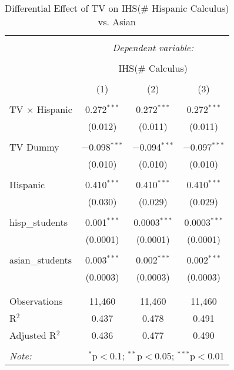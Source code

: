 
\begin{table}[!htbp] \centering 
  \caption{Differential Effect of TV on IHS(\# Hispanic Calculus) vs. Asian} 
  \label{} 
\begin{tabular}{@{\extracolsep{-2pt}}lccc} 
\\[-1.8ex]\hline 
\hline \\[-1.8ex] 
 & \multicolumn{3}{c}{\textit{Dependent variable:}} \\ 
\cline{2-4} 
\\[-1.8ex] & \multicolumn{3}{c}{IHS(\# Calculus)} \\ 
\\[-1.8ex] & (1) & (2) & (3)\\ 
\hline \\[-1.8ex] 
 TV $\times$ Hispanic & 0.272$^{***}$ & 0.272$^{***}$ & 0.272$^{***}$ \\ 
  & (0.012) & (0.011) & (0.011) \\ 
  & & & \\ 
 TV Dummy & $-$0.098$^{***}$ & $-$0.094$^{***}$ & $-$0.097$^{***}$ \\ 
  & (0.010) & (0.010) & (0.010) \\ 
  & & & \\ 
 Hispanic & 0.410$^{***}$ & 0.410$^{***}$ & 0.410$^{***}$ \\ 
  & (0.030) & (0.029) & (0.029) \\ 
  & & & \\ 
 hisp\_students & 0.001$^{***}$ & 0.0003$^{***}$ & 0.0003$^{***}$ \\ 
  & (0.0001) & (0.0001) & (0.0001) \\ 
  & & & \\ 
 asian\_students & 0.003$^{***}$ & 0.002$^{***}$ & 0.002$^{***}$ \\ 
  & (0.0003) & (0.0003) & (0.0003) \\ 
  & & & \\ 
\hline \\[-1.8ex] 
Observations & 11,460 & 11,460 & 11,460 \\ 
R$^{2}$ & 0.437 & 0.478 & 0.491 \\ 
Adjusted R$^{2}$ & 0.436 & 0.477 & 0.490 \\ 
\hline 
\hline \\[-1.8ex] 
\textit{Note:}  & \multicolumn{3}{r}{$^{*}$p$<$0.1; $^{**}$p$<$0.05; $^{***}$p$<$0.01} \\ 
\end{tabular} 
\end{table} 
